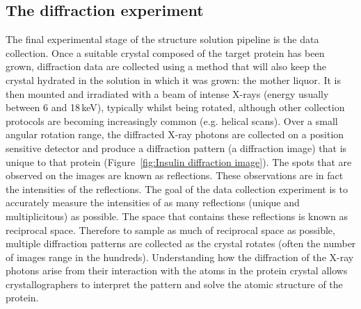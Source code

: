     \subsection{The diffraction experiment}
    \label{sub:The diffraction experiment}
        The final experimental stage of the structure solution pipeline is the data collection.
        Once a suitable crystal composed of the target protein has been grown, diffraction data are collected using a method that will also keep the crystal hydrated in the solution in which it was grown: the mother liquor.
        It is then mounted and irradiated with a beam of intense X-rays (energy usually between 6 and 18\,keV), typically whilst being rotated, although other collection protocols are becoming increasingly common (e.g. helical scans).
        Over a small angular rotation range, the diffracted X-ray photons are collected on a position sensitive detector and produce a diffraction pattern (a diffraction image) that is unique to that protein (Figure~\ref{fig:Insulin diffraction image}).
        The spots that are observed on the images are known as reflections. These observations are in fact the intensities of the reflections.
        The goal of the data collection experiment is to accurately measure the intensities of as many reflections (unique and multiplicitous) as possible.
        The space that contains these reflections is known as reciprocal space.
        Therefore to sample as much of reciprocal space as possible, multiple diffraction patterns are collected as the crystal rotates (often the number of images range in the hundreds).
        Understanding how the diffraction of the X-ray photons arise from their interaction with the atoms in the protein crystal allows crystallographers to interpret the pattern and solve the atomic structure of the protein.
